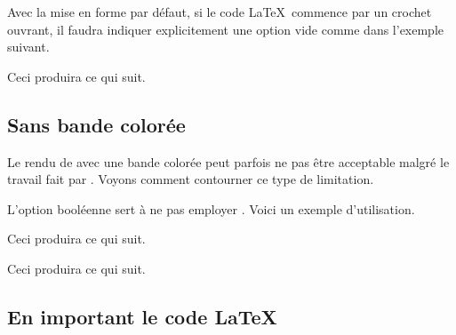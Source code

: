 

\begin{bdocwarn}
    Avec la mise en forme par défaut, si le code \LaTeX\ commence par un crochet ouvrant, il faudra indiquer explicitement une option vide comme dans l'exemple suivant.


    Ceci produira ce qui suit.

    \medskip

    
\end{bdocwarn}




\subsection{Sans bande colorée}

Le rendu de  avec une bande colorée peut parfois ne pas être acceptable malgré le travail fait par .
Voyons comment contourner ce type de limitation.

\begin{bdocexa}
    L'option booléenne  sert à ne pas employer .
    Voici un exemple d'utilisation.


    Ceci produira ce qui suit.

    \medskip

    
\end{bdocexa}




\begin{bdocexa}
    \leavevmode


    Ceci produira ce qui suit.

    \medskip

    
\end{bdocexa}




\subsection{En important le code \LaTeX}

